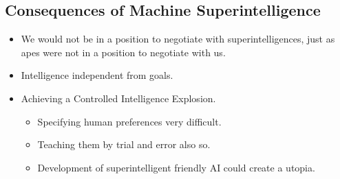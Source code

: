 \subsection{Consequences of Machine Superintelligence}

\begin{itemize}
    \item We would not be in a position to negotiate with superintelligences, just as apes were not in a position to negotiate with us.
    \item Intelligence independent from goals.
    \item Achieving a Controlled Intelligence Explosion.
    \begin{itemize}
        \item Specifying human preferences very difficult.
        \item Teaching them by trial and error also so.
        \item Development of superintelligent friendly AI could create a utopia.
    \end{itemize}
\end{itemize}